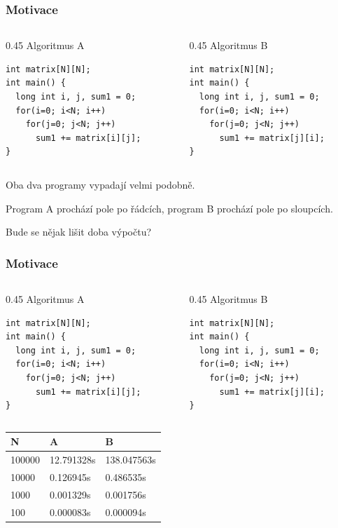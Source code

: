 \begin{frame}[fragile]
\frametitle{Motivace}

\begin{columns}
\begin{column}{0.45\textwidth}
Algoritmus A\\
\begin{verbatim}
int matrix[N][N];
int main() {
  long int i, j, sum1 = 0;
  for(i=0; i<N; i++)
    for(j=0; j<N; j++)
      sum1 += matrix[i][j];
}
\end{verbatim}
\end{column}
\hfill
\begin{column}{0.45\textwidth}
Algoritmus B\\
\begin{verbatim}
int matrix[N][N];
int main() {
  long int i, j, sum1 = 0;
  for(i=0; i<N; i++)
    for(j=0; j<N; j++)
      sum1 += matrix[j][i];
}
\end{verbatim}
\end{column}
\end{columns}
\bigskip
Oba dva programy vypadají velmi podobně. 

Program A prochází pole po řádcích, program B prochází pole po sloupcích.
\bigskip

Bude se nějak lišit doba výpočtu?

\end{frame}

\begin{frame}[fragile]
\frametitle{Motivace}

\begin{columns}
\begin{column}{0.45\textwidth}
Algoritmus A\\
\begin{verbatim}
int matrix[N][N];
int main() {
  long int i, j, sum1 = 0;
  for(i=0; i<N; i++)
    for(j=0; j<N; j++)
      sum1 += matrix[i][j];
}
\end{verbatim}
\end{column}
\hfill
\begin{column}{0.45\textwidth}
Algoritmus B\\
\begin{verbatim}
int matrix[N][N];
int main() {
  long int i, j, sum1 = 0;
  for(i=0; i<N; i++)
    for(j=0; j<N; j++)
      sum1 += matrix[j][i];
}
\end{verbatim}
\end{column}
\end{columns}
\bigskip

\begin{tabular}{|l|l|l|}\hline
N & A & B \\\hline
100000 & 12.791328s &138.047563s \\\hline
10000 & 0.126945s &0.486535s \\\hline
1000 & 0.001329s &0.001756s \\\hline
100 & 0.000083s &0.000094s \\\hline
\end{tabular}
\end{frame}

